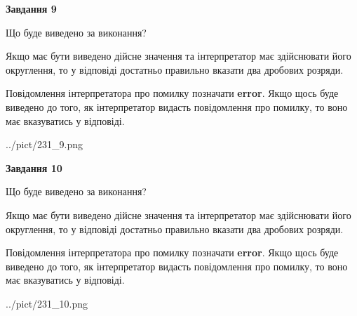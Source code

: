 \documentclass[12pt, ukrainian]{article}
\begin{document}
{\begin {Large}
{\begin {center}\textbf{Завдання 9}\end {center}}\par
Що буде виведено за виконання? \par

Якщо має бути виведено дійсне значення та інтерпретатор має здійснювати його округлення, 
то у відповіді достатньо правильно вказати два дробових розряди.

Повідомлення інтерпретатора про помилку позначати \textbf{error}.
Якщо щось буде виведено до того, як інтерпретатор видасть повідомлення про помилку, 
то воно має вказуватись у відповіді. \par

\begin{center}
	{../pict/231_9.png}
\end{center}
\newpage

{\begin {center}\textbf{Завдання 10}\end {center}}\par
Що буде виведено за виконання? \par

Якщо має бути виведено дійсне значення та інтерпретатор має здійснювати його округлення, 
то у відповіді достатньо правильно вказати два дробових розряди.

Повідомлення інтерпретатора про помилку позначати \textbf{error}.
Якщо щось буде виведено до того, як інтерпретатор видасть повідомлення про помилку, 
то воно має вказуватись у відповіді. \par

\begin{center}
	{../pict/231_10.png}
\end{center}
\newpage

\end {Large}}
\end{document}
